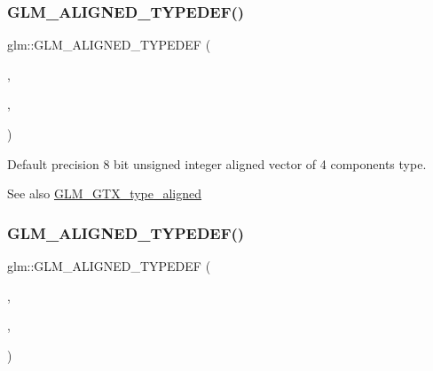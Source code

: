 \subsubsection{\texorpdfstring{G\+L\+M\+\_\+\+A\+L\+I\+G\+N\+E\+D\+\_\+\+T\+Y\+P\+E\+D\+E\+F()}{GLM\_ALIGNED\_TYPEDEF()}\hspace{0.1cm}{\footnotesize\ttfamily [124/209]}}
{\footnotesize\ttfamily glm\+::\+G\+L\+M\+\_\+\+A\+L\+I\+G\+N\+E\+D\+\_\+\+T\+Y\+P\+E\+D\+EF (\begin{DoxyParamCaption}\item[{\hyperlink{group__gtc__type__precision_gaf3c840b8a90a194559121504ba599197}{u8vec4}}]{,  }\item[{aligned\+\_\+u8vec4}]{,  }\item[{4}]{ }\end{DoxyParamCaption})}

Default precision 8 bit unsigned integer aligned vector of 4 components type. \begin{DoxySeeAlso}{See also}
\hyperlink{group__gtx__type__aligned}{G\+L\+M\+\_\+\+G\+T\+X\+\_\+type\+\_\+aligned} 
\end{DoxySeeAlso}
\mbox{\label{group__gtx__type__aligned_ga991abe990c16de26b2129d6bc2f4c051}} 
\subsubsection{\texorpdfstring{G\+L\+M\+\_\+\+A\+L\+I\+G\+N\+E\+D\+\_\+\+T\+Y\+P\+E\+D\+E\+F()}{GLM\_ALIGNED\_TYPEDEF()}\hspace{0.1cm}{\footnotesize\ttfamily [125/209]}}
{\footnotesize\ttfamily glm\+::\+G\+L\+M\+\_\+\+A\+L\+I\+G\+N\+E\+D\+\_\+\+T\+Y\+P\+E\+D\+EF (\begin{DoxyParamCaption}\item[{\hyperlink{group__gtc__type__precision_ga809cb55e5fed3456686aae96e7e8684c}{u16vec1}}]{,  }\item[{aligned\+\_\+u16vec1}]{,  }\item[{2}]{ }\end{DoxyParamCaption})}

